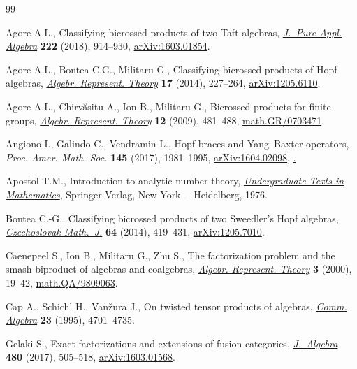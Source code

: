 \begin{thebibliography}{99}
\footnotesize\itemsep=0pt

Agore A.L., Classifying bicrossed products of two {T}aft algebras,
 \href{https://doi.org/10.1016/j.jpaa.2017.05.014}{\textit{J.~Pure Appl. Algebra}} \textbf{222} (2018), 914--930,
 \href{https://arxiv.org/abs/1603.01854}{arXiv:1603.01854}.

Agore A.L., Bontea C.G., Militaru G., Classifying bicrossed products of {H}opf
 algebras, \href{https://doi.org/10.1007/s10468-012-9396-5}{\textit{Algebr. Represent. Theory}} \textbf{17} (2014), 227--264,
 \href{https://arxiv.org/abs/1205.6110}{arXiv:1205.6110}.

Agore A.L., Chirv\u{a}situ A., Ion B., Militaru G., Bicrossed products for
 finite groups, \href{https://doi.org/10.1007/s10468-009-9145-6}{\textit{Algebr. Represent. Theory}} \textbf{12} (2009),
 481--488, \href{https://arxiv.org/abs/math.GR/0703471}{math.GR/0703471}.

Angiono I., Galindo C., Vendramin L., Hopf braces and {Y}ang--{B}axter
 operators, \textit{Proc. Amer. Math. Soc.} \textbf{145} (2017), 1981--1995,
 \href{https://arxiv.org/abs/#2}{arXiv:1604.02098}, \href{https://doi.org/10.1090/proc/13395}.

Apostol T.M., Introduction to analytic number theory, \href{https://doi.org/10.1007/978-1-4757-5579-4}{\textit{Undergraduate Texts in Mathematics}}, Springer-Verlag, New York~-- Heidelberg, 1976.

Bontea C.-G., Classifying bicrossed products of two {S}weedler's {H}opf
 algebras, \href{https://doi.org/10.1007/s10587-014-0109-6}{\textit{Czechoslovak Math.~J.}} \textbf{64} (2014), 419--431,
 \href{https://arxiv.org/abs/1205.7010}{arXiv:1205.7010}.

Caenepeel S., Ion B., Militaru G., Zhu S., The factorization problem and the
 smash biproduct of algebras and coalgebras, \href{https://doi.org/10.1023/A:1009917210863}{\textit{Algebr. Represent.
 Theory}} \textbf{3} (2000), 19--42, \href{https://arxiv.org/abs/math.QA/9809063}{math.QA/9809063}.

Cap A., Schichl H., Van\v{z}ura J., On twisted tensor products of algebras,
 \href{https://doi.org/10.1080/00927879508825496}{\textit{Comm. Algebra}} \textbf{23} (1995), 4701--4735.

Gelaki S., Exact factorizations and extensions of fusion categories,
 \href{https://doi.org/10.1016/j.jalgebra.2017.02.034}{\textit{J.~Algebra}} \textbf{480} (2017), 505--518, \href{https://arxiv.org/abs/1603.01568}{arXiv:1603.01568}.


\end{thebibliography}
